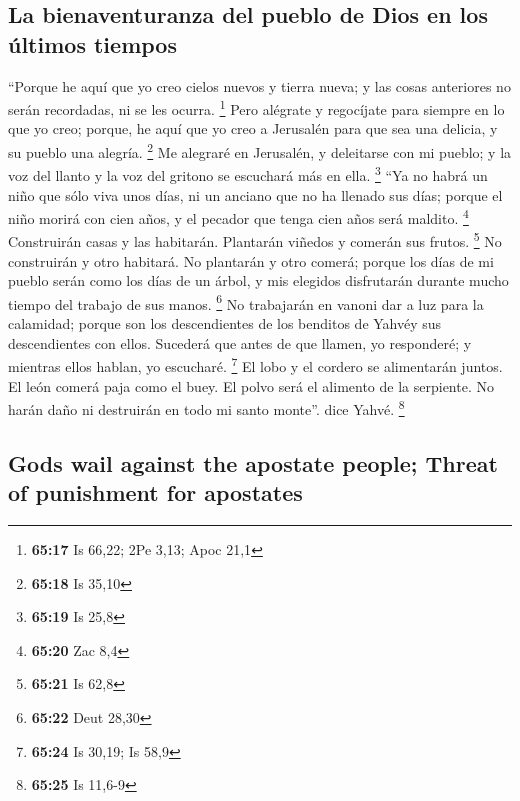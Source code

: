 \begin{paracol}{2}
{\subsection{La bienaventuranza del pueblo de Dios en los últimos
tiempos}\label{la-bienaventuranza-del-pueblo-de-dios-en-los-uxfaltimos-tiempos}}

 ``Porque he aquí que yo creo cielos nuevos y tierra
nueva; y las cosas anteriores no serán recordadas, ni se les ocurra.
\footnote{\textbf{65:17} Is 66,22; 2Pe 3,13; Apoc 21,1} 
Pero alégrate y regocíjate para siempre en lo que yo creo; porque, he
aquí que yo creo a Jerusalén para que sea una delicia, y su pueblo una
alegría. \footnote{\textbf{65:18} Is 35,10}  Me alegraré
en Jerusalén, y deleitarse con mi pueblo; y la voz del llanto y la voz
del gritono se escuchará más en ella. \footnote{\textbf{65:19} Is 25,8}
 ``Ya no habrá un niño que sólo viva unos días, ni un
anciano que no ha llenado sus días; porque el niño morirá con cien años,
y el pecador que tenga cien años será maldito. \footnote{\textbf{65:20}
  Zac 8,4}  Construirán casas y las habitarán. Plantarán
viñedos y comerán sus frutos. \footnote{\textbf{65:21} Is 62,8}
 No construirán y otro habitará. No plantarán y otro
comerá; porque los días de mi pueblo serán como los días de un árbol, y
mis elegidos disfrutarán durante mucho tiempo del trabajo de sus manos.
\footnote{\textbf{65:22} Deut 28,30}  No trabajarán en
vanoni dar a luz para la calamidad; porque son los descendientes de los
benditos de Yahvéy sus descendientes con ellos.  Sucederá
que antes de que llamen, yo responderé; y mientras ellos hablan, yo
escucharé. \footnote{\textbf{65:24} Is 30,19; Is 58,9} 
El lobo y el cordero se alimentarán juntos. El león comerá paja como el
buey. El polvo será el alimento de la serpiente. No harán daño ni
destruirán en todo mi santo monte''. dice Yahvé. \footnote{\textbf{65:25}
  Is 11,6-9}

\switchcolumn
\begin{otherlanguage}{english}

\hypertarget{gods-wail-against-the-apostate-people-threat-of-punishment-for-apostates}{%
\subsection{Gods wail against the apostate people; Threat of punishment
for
apostates}\label{gods-wail-against-the-apostate-people-threat-of-punishment-for-apostates}}


\end{otherlanguage}
\end{paracol}
